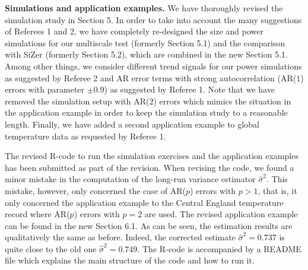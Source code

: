 \documentclass[a4paper,12pt]{article}
\begin{document}
\newpage
\textbf{Simulations and application examples.} We have thoroughly revised the simulation study in Section 5. In order to take into account the many suggestions of Referees 1 and 2, we have completely re-designed the size and power simulations for our multiscale test (formerly Section 5.1) and the comparison with SiZer (formerly Section 5.2), which are combined in the new Section 5.1. Among other things, we consider different trend signals for our power simulations as suggested by Referee 2 and AR error terms with strong autocorrelation (AR($1$) errors with parameter $\pm 0.9$) as suggested by Referee 1. Note that we have removed the simulation setup with AR($2$) errors which mimics the situation in the application example in order to keep the simulation study to a reasonable length. Finally, we have added a second application example to global temperature data as requested by Referee 1. 


The revised R-code to run the simulation exercises and the application examples has been submitted as part of the revision. When revising the code, we found a minor mistake in the computation of the long-run variance estimator $\widehat{\sigma}^2$. This mistake, however, only concerned the case of AR($p$) errors with $p > 1$, that is, it only concerned the application example to the Central England temperature record where AR($p$) errors with $p=2$ are used. The revised application example can be found in the new Section 6.1. As can be seen, the estimation results are qualitatively the same as before. Indeed, the corrected estimate $\widehat{\sigma}^2 = 0.737$ is quite close to the old one $\widehat{\sigma}^2 = 0.749$. The R-code is accompanied by a README file which explains the main structure of the code and how to run it.  




\end{document}
